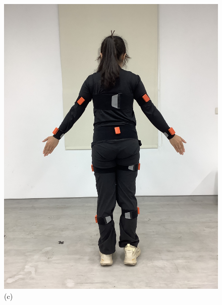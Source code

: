 \begin{figure}[!ht]
\begin{minipage}{.25\textwidth}
      \includegraphics[width=\linewidth, angle=-90]{figure/ch3_fig_backimu.JPG}
      \caption*{(c)}
   \end{minipage}%
   \begin{minipage}{.25\textwidth}
     \centering

\end{minipage}
\end{figure}
